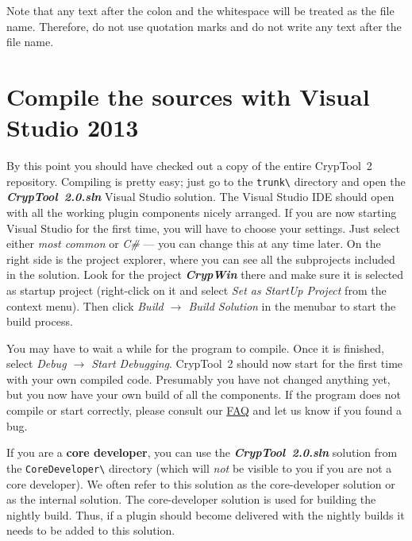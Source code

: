 \begin{center}
\end{center}

Note that any text after the colon and the whitespace will be treated as the file name. Therefore, do not use quotation marks and do not write any text after the file name.

\section{Compile the sources with Visual Studio 2013}
\label{CompilingTheSourcesVS}

By this point you should have checked out a copy of the entire CrypTool~2 repository. Compiling is pretty easy; just go to the \texttt{trunk\textbackslash} directory and open the \textbf{\textit{CrypTool~2.0.sln}} Visual Studio solution. The Visual Studio IDE should open with all the working plugin components nicely arranged. If you are now starting Visual Studio for the first time, you will have to choose your settings. Just select either \textit{most common} or \textit{C\#} --- you can change this at any time later. On the right side is the project explorer, where you can see all the subprojects included in the solution. Look for the project \textbf{\textit{CrypWin}} there and make sure it is selected as startup project (right-click on it and select \textit{Set as StartUp Project} from the context menu). Then click \textit{Build $\rightarrow$ Build Solution} in the menubar to start the build process.

You may have to wait a while for the program to compile. Once it is finished, select \textit{Debug $\rightarrow$ Start Debugging}. CrypTool~2 should now start for the first time with your own compiled code. Presumably you have not changed anything yet, but you now have your own build of all the components. If the program does not compile or start correctly, please consult our \href{https://www.cryptool.org/trac/CrypTool2/wiki/FAQ}{FAQ} and let us know if you found a bug.

If you are a \textbf{core developer}, you can use the \textbf{\textit{CrypTool~2.0.sln}} solution from the \texttt{CoreDeveloper\textbackslash} directory (which will \textit{not} be visible to you if you are not a core developer). We often refer to this solution as the core-developer solution or as the internal solution. The core-developer solution is used for building the nightly build. Thus, if a plugin should become delivered with the nightly builds it needs to be added to this solution.

